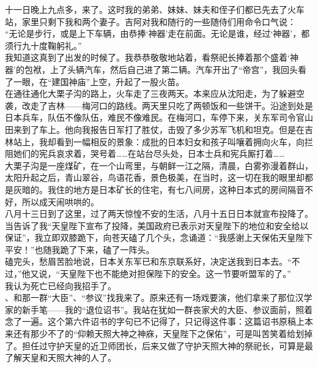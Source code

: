 十一日晚上九点多，来了。这时我的弟弟、妹妹、妹夫和侄子们都已先去了火车站，家里只剩下我和两个妻子。吉阿对我和随行的一些随侍们用命令口气说：\\

“无论是步行，或是上下车辆，由恭捧‘神器’走在前面。无论是谁，经过‘神器’，都须行九十度鞠躬礼。”\\

我知道这真到了出发的时候了。我恭恭敬敬地站着，看祭祀长捧着那个盛着‘神器’的包袱，上了头辆汽车，然后自己进了第二辆。汽车开出了“帝宫”，我回头看了一眼，在“建国神庙”上空，升起了一股火苗。\\

在通往通化大栗子沟的路上，火车走了三夜两天。本来应从沈阳走，为了躲避空袭，改走了吉林——梅河口的路线。两天里只吃了两顿饭和一些饼干。沿途到处是日本兵车，队伍不像队伍，难民不像难民。在梅河口，车停下来，关东军司令官山田来到了车上。他向我报告日军打了胜仗，击毁了多少苏军飞机和坦克。但是在吉林站上，我却看到一幅相反的景象：成批的日本妇女和孩子叫嚷着拥向火车，向拦阻她们的宪兵哀求着，哭号着……在站台尽头处，日本士兵和宪兵厮打着……\\

大栗子沟是一座煤矿，在一个山弯里，与朝鲜一江之隔，清晨，白雾弥漫着群山，太阳升起之后，青山翠谷，鸟语花香，景色极美，在当时，这一切在我的眼里却都是灰暗的。我住的地方是日本矿长的住宅，有七八间房，这种日本式的房间隔音不好，所以成天闹哄哄的。\\

八月十三日到了这里，过了两天惊惶不安的生活，八月十五日日本就宣布投降了。\\

当告诉了我“天皇陛下宣布了投降，美国政府已表示对天皇陛下的地位和安全给以保证”，我立即双膝跪下，向苍天磕了几个头，念诵道：“我感谢上天保佑天皇陛下平安！”也随我跪了下来，磕了一阵头。\\

磕完头，愁眉苦脸地说，日本关东军已和东京联系好，决定送我到日本去。“不过，”他又说，“天皇陛下也不能绝对担保陛下的安全。这一节要听盟军的了。”\\

我认为死亡已经向我招手了。\\

、和那一群“大臣”、“参议”找我来了。原来还有一场戏要演，他们拿来了那位汉学家的新手笔——我的“退位诏书”。我站在犹如一群丧家犬的大臣、参议面前，照着念了一遍。这个第六件诏书的字句已不记得了，只记得这件事：这篇诏书原稿上本来还有那少不了的“仰赖天照大神之神庥，天皇陛下之保佑”，可是叫苦笑着给划掉了。担任过守护天皇的近卫师团长，后来又做了守护天照大神的祭祀长，可算是最了解天皇和天照大神的人了。\\

